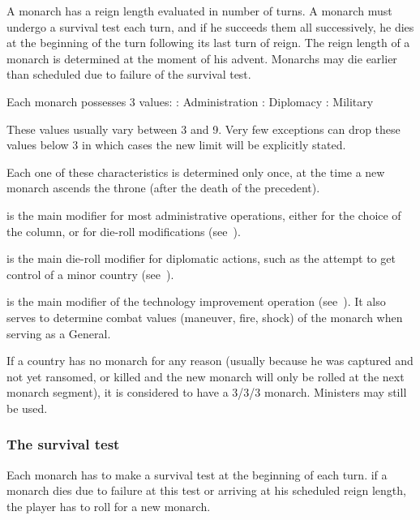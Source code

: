  A monarch has a reign length evaluated in number of
turns. A monarch must undergo a survival test each turn, and if he succeeds
them all successively, he dies at the beginning of the turn following its last
turn of reign. The reign length of a monarch is determined at the moment of
his advent.%
\bparag Monarchs may die earlier than scheduled due to failure of the survival
test.

 Each monarch possesses 3 values:
\bparag \ADM: Administration
\bparag \DIP: Diplomacy
\bparag \MIL: Military

\aparag These values usually vary between 3 and 9. Very few exceptions can
drop these values below 3 in which cases the new limit will be explicitly
stated.

\aparag Each one of these characteristics is determined only once, at the time
a new monarch ascends the throne (after the death of the precedent).

 \ADM is the main modifier for most
administrative operations, either for the choice of the column, or for
die-roll modifications (see~).

 \DIP is the main die-roll modifier for diplomatic
actions, such as the attempt to get control of a minor country
(see~).

 \MIL is the main modifier of the technology
improvement operation (see~). It also serves to determine combat values (maneuver, fire,
shock) of the monarch when serving as a General.

\aparag[No monarch] If a country has no monarch for any reason (usually
because he was captured and not yet ransomed, or killed and the new monarch
will only be rolled at the next monarch segment), it is considered to have a
3/3/3 monarch.
\bparag Ministers may still be used.

\subsubsection{The survival test}
\aparag Each monarch has to make a survival test at the beginning of each
turn.
\bparag if a monarch dies due to failure at this test or arriving at his
scheduled reign length, the player has to roll for a new monarch.


